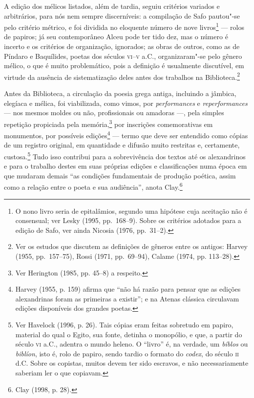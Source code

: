 A edição dos mélicos listados, além de tardia, seguiu critérios variados e
arbitrários, para nós nem sempre discerníveis: a compilação de Safo pautou"-se
pelo critério métrico, e foi dividida no eloquente número de nove
livros\footnote{ O nono livro seria de epitalâmios, segundo uma hipótese cuja
aceitação não é consensual; ver Lesky (1995, pp.~168--9). Sobre os critérios
adotados para a edição de Safo, ver ainda Nicosia (1976, pp.~31--2).}  --- rolos de papiros; já seu contemporâneo Alceu pode ter
tido dez, mas o número é incerto e os critérios de
organização, ignorados; as obras de outros, como as de Píndaro e Baquílides,
poetas dos séculos \textsc{vi}--\textsc{v} a.C., organizaram"-se pelo gênero mélico, o
que é muito problemático, pois a definição é usualmente discutível,
em virtude da ausência de sistematização deles antes dos trabalhos na
Biblioteca.\footnote{ Ver os estudos que discutem as definições de gêneros entre os
antigos: Harvey (1955, pp.~157--75), Rossi (1971, pp.~69--94), Calame (1974, pp.
113--28).}

Antes da Biblioteca, a circulação da poesia grega antiga, incluindo a jâmbica,
elegíaca e mélica, foi viabilizada, como vimos, por \textit{performances} e
\textit{reperformances} --- nos mesmos moldes ou não, profissionais ou amadoras ---, pela
simples repetição propiciada pela memória,\footnote{ Ver Herington (1985, pp.
45--8) a respeito.} por inscrições comemorativas em monumentos, por possíveis
edições\footnote{ Harvey (1955, p. 159) afirma que “não há razão para pensar
que as edições alexandrinas foram as primeiras a existir”; e na Atenas clássica
circulavam edições disponíveis dos grandes poetas.} --- termo que deve ser
entendido como cópias de um registro original, em quantidade e difusão muito
restritas e, certamente, custosa.\footnote{ Ver Havelock (1996, p. 26). Tais
cópias eram feitas sobretudo em papiro, material do qual o Egito, sua fonte,
detinha o monopólio, e que, a partir do século \textsc{vi} a.C., adentra o mundo heleno.
O “livro” é, na verdade, um \textit{bíblos} ou \textit{biblíon}, isto é, rolo
de papiro, sendo tardio o formato do \textit{codex}, do século \textsc{ii} d.C. Sobre
os copistas, muitos devem ter sido escravos, e não necessariamente saberiam ler
o que copiavam.} Tudo isso contribui para a sobrevivência dos textos até os
alexandrinos e para o trabalho destes em suas próprias edições e classificações
numa época em que mudaram demais “as condições fundamentais de produção
poética, assim como a relação entre o poeta e sua audiência”, anota Clay.\footnote{ Clay (1998, p. 28).} 

